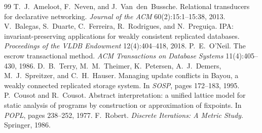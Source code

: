 \begin{thebibliography}{99}
 T.~J.~Ameloot, F.~Neven, and J.~Van~den~Bussche. Relational transducers for
  declarative networking. \emph{Journal of the ACM} 60(2):15:1--15:38, 2013.
 V.~Balegas, S.~Duarte, C.~Ferreira, R.~Rodrigues, and N.~Pregui\c{c}a. IPA:
  invariant-preserving applications for weakly consistent replicated databases. \emph{Proceedings of
  the VLDB Endowment} 12(4):404--418, 2018.
 P.~E.~O'Neil. The escrow transactional method. \emph{ACM Transactions on Database
  Systems} 11(4):405--430, 1986.
 D.~B.~Terry, M.~M.~Theimer, K.~Petersen, A.~J.~Demers, M.~J.~Spreitzer, and
  C.~H.~Hauser. Managing update conflicts in Bayou, a weakly connected replicated storage system. In
  \emph{SOSP}, pages 172--183, 1995.
 P.~Cousot and R.~Cousot. Abstract interpretation: a unified lattice model for
  static analysis of programs by construction or approximation of fixpoints. In \emph{POPL}, pages
  238--252, 1977.
 F.~Robert. \emph{Discrete Iterations: A Metric Study}. Springer, 1986.
\end{thebibliography}
